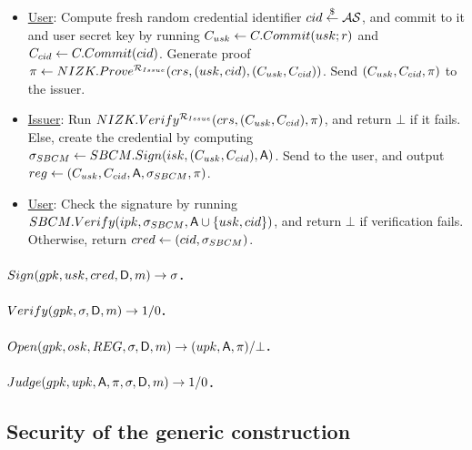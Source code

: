 \begin{itemize}
\item \underline{User}: Compute fresh random credential identifier
  $cid \stackrel{\$}{\gets} \mathcal{AS}$, and commit to it and user secret key by
  running $C_{usk} \gets C.Commit(usk; r)$ and $C_{cid} \gets
  C.Commit(cid)$. Generate proof $\pi \gets
  NIZK.Prove^{\mathcal{R}_{Issue}}(crs,(usk,cid),(C_{usk},C_{cid}))$.
  Send $(C_{usk},C_{cid},\pi)$ to the issuer.
\item \underline{Issuer}: Run $NIZK.Verify^{\mathcal{R}_{Issue}}(crs,
  (C_{usk},C_{cid}),\pi)$, and return $\bot$ if it fails. Else,
  create the credential by computing $\sigma_{SBCM} \gets SBCM.Sign(isk,(
  C_{usk},C_{cid}),\mathsf{A})$. Send \SBCMsig to the user, and output
  $reg \gets (C_{usk},C_{cid},\mathsf{A},\sigma_{SBCM},\pi)$.
\item \underline{User}: Check the signature by running $SBCM.Verify(ipk,
  \sigma_{SBCM},\mathsf{A} \cup \lbrace usk,cid \rbrace)$, and return $\bot$ if
  verification fails. Otherwise, return $cred \gets (cid,\sigma_{SBCM})$.
\end{itemize}

\paragraph{$Sign(gpk,usk,cred,\mathsf{D},m) \rightarrow \sigma$.} %

\paragraph{$Verify(gpk,\sigma,\mathsf{D},m) \rightarrow 1/0$.} %

\paragraph{$\Open(\gpk,\osk,\trans,\sig,\DAttrs,\msg)
  \rightarrow (\upk,\Attrs,\oproof)/\bot$.} %

\paragraph{$Judge(gpk,upk,\mathsf{A},\pi,\sigma,\mathsf{D},m)
  \rightarrow 1/0$.} %

\subsection{Security of the generic \GSAC construction}
\label{ssec:gsac-const-sec}

